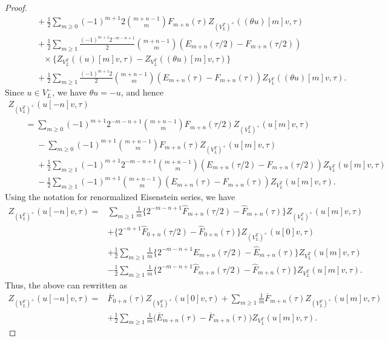 \documentclass[pdftex]{sigma}
\numberwithin{equation}{section}
\theoremstyle{definition}
\begin{document}
\begin{proof}
\begin{gather*}
\phantom{\qquad=}{}+\frac{1}{2}\sum_{m\geq 0}(-1)^{m+1}2\binom{m+n-1}{m}F_{m+n}(\tau) Z_{(V_L^T)^+}((\theta u)[m]v,\tau)\\
\phantom{\qquad=}{}
+ \frac{1}{2} \sum_{m \geq 1} \frac{(-1)^{m+1} 2^{-m-n+1}}{2} \binom{m+n-1}{m} ( E_{m+n}(\tau/2) - F_{m+n}(\tau/2) ) \\
\phantom{\qquad=+}{}\times \{ Z_{V_L^T}((u)[m]v, \tau) - Z_{V_L^T}((\theta u)[m]v, \tau) \}
\\
\phantom{\qquad=}{}+\frac{1}{2}\sum_{m\geq 1}\frac{(-1)^{m+1}2}{2}\binom{m+n-1}{m}(E_{m+n}(\tau)-F_{m+n}(\tau))Z_{V_L^T}((\theta u)[m]v, \tau).
\end{gather*}
Since $u\in V_L^-$, we have $\theta u=-u$, and hence
\begin{gather*}
Z_{(V_L^T)^+}(u[-n]v,\tau)\\
\qquad=\sum_{m\geq 0}(-1)^{m+1}2^{-m-n+1}\binom{m+n-1}{m}F_{m+n}(\tau/2) Z_{(V_L^T)^+}(u[m]v,\tau)\\
\phantom{\qquad=}{}-\sum_{m\geq 0}(-1)^{m+1}\binom{m+n-1}{m}F_{m+n}(\tau) Z_{(V_L^T)^+}(u[m]v,\tau)\\
\phantom{\qquad=}{}+\frac{1}{2}\sum_{m\geq 1}(-1)^{m+1}2^{-m-n+1}\binom{m+n-1}{m}(E_{m+n}(\tau/2)-F_{m+n}(\tau/2))Z_{V_L^T}(u[m]v, \tau)\\
\phantom{\qquad=}{}-\frac{1}{2}\sum_{m\geq 1}(-1)^{m+1}\binom{m+n-1}{m}(E_{m+n}(\tau)-F_{m+n}(\tau))Z_{V_L^T}(u[m]v, \tau).
\end{gather*}
Using the notation for renormalized Eisenstein series, we have
\begin{align*}
Z_{(V_L^T)^+}(u[-n]v,\tau)={}&\sum_{m\geq 1}\frac{1}{m}\bigl\{2^{-m-n+1}\hat{F}_{m+n}(\tau/2) -\hat{F}_{m+n}(\tau)\bigr\}Z_{(V_L^T)^+}(u[m]v,\tau)\\
&+\bigl\{2^{-n+1}\hat{F}_{0+n}(\tau/2) -\hat{F}_{0+n}(\tau)\bigr\}Z_{(V_L^T)^+}(u[0]v,\tau)\\
&+\frac{1}{2}\sum_{m\geq 1}\frac{1}{m}\bigl\{2^{-m-n+1}\hat{E}_{m+n}(\tau/2) -\hat{E}_{m+n}(\tau)\bigr\}Z_{V_L^T}(u[m]v, \tau)\\
&-\frac{1}{2}\sum_{m\geq 1}\frac{1}{m}\bigl\{2^{-m-n+1}\hat{F}_{m+n}(\tau/2) -\hat{F}_{m+n}(\tau)\bigr\}Z_{V_L^T}(u[m]v, \tau).
\end{align*}
Thus, the above can rewritten as
\begin{align*}
Z_{(V_L^T)^+}(u[-n]v,\tau)={}& \overline{F}_{0+n}(\tau)Z_{(V_L^T)^+}(u[0]v,\tau)+\sum_{m\geq 1}\frac{1}{m}\overline{F}_{m+n}(\tau)Z_{(V_L^T)^+}(u[m]v,\tau)\\
& +\frac{1}{2}\sum_{m\geq 1}\frac{1}{m}\bigl(\overline{E}_{m+n}(\tau)-\overline{F}_{m+n}(\tau)\bigr)Z_{V_L^T}(u[m]v, \tau).\tag*{\qed}
\end{align*}\renewcommand{\qed}{}
\end{proof}
\end{document}
